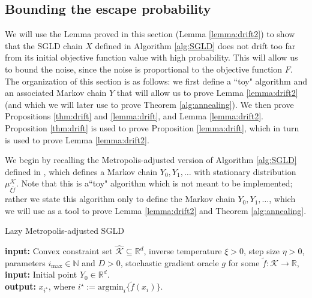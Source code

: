 \documentclass[final,12pt]{colt2018} %
\begin{document}
{\subsection{Bounding the escape probability}
\label{sec:drift}
%
We will use the Lemma proved in this section (Lemma \ref{lemma:drift2}) to show that the SGLD chain $X$ defined in Algorithm \ref{alg:SGLD} does not drift too far from its initial objective function value with high probability.
%
This will allow us to bound the noise, since the noise is proportional to the objective function $F$.
%
The organization of this section is as follows: we first define a ``toy" algorithm and an associated Markov chain $Y$ that will allow us to prove Lemma \ref{lemma:drift2} (and which we will later use to prove Theorem \ref{alg:annealing}).  We then prove Propositions \ref{thm:drift} and \ref{lemma:drift}, and Lemma \ref{lemma:drift2}. Proposition \ref{thm:drift} is used to prove Proposition \ref{lemma:drift}, which in turn is used to prove Lemma \ref{lemma:drift2}.

We begin by recalling the Metropolis-adjusted version of Algorithm \ref{alg:SGLD} defined in \cite{hitting_times}, which defines a Markov chain $Y_0,Y_1,\ldots$ with stationary distribution $\mu_{\xi\tilde{f}}^{\mathcal{K}}$.  Note that this is a``toy" algorithm which is not meant to be implemented; rather we state this algorithm only to define the Markov chain $Y_0,Y_1,\ldots$, which we will use as a tool to prove Lemma \ref{lemma:drift2} and Theorem \ref{alg:annealing}.
%
\begin{algorithm}[H]
\caption{Lazy Metropolis-adjusted SGLD \label{alg:SGLD_metropolis}} 
\flushleft
\textbf{input:} Convex constraint set $\hat{\mathcal{K}} \subseteq \mathbb{R}^d$, inverse temperature $\xi>0$, step size $\eta > 0$, parameters $i_{\max} \in \mathbb{N}$ and $D>0$, stochastic gradient oracle $g$ for some $\tilde{f}:\mathcal{K} \rightarrow \mathbb{R}$, \\
 \textbf{input:}   Initial point $Y_0 \in \mathbb{R}^d$.\\
%
%
%
%
%
\textbf{output:} $x_{i^\star}$, where $i^\star := \mathrm{argmin}_i \{\tilde{f}(x_i)\}$.
%
\end{algorithm}

}
\end{document}
